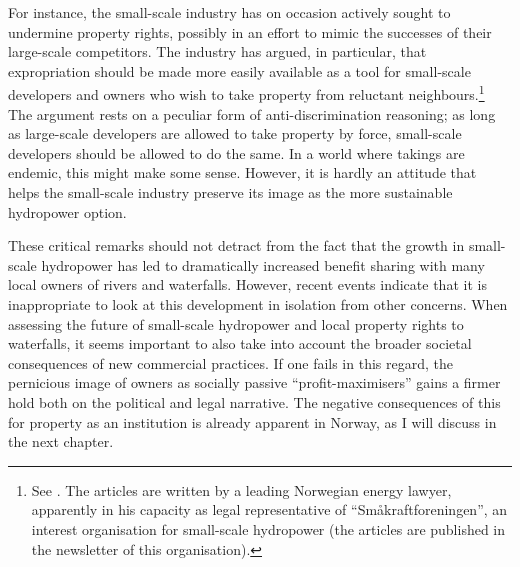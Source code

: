 For instance, the small-scale industry has on occasion actively sought to undermine property rights, possibly in an effort to mimic the successes of their large-scale competitors. The industry has argued, in particular, that expropriation should be made more easily available as a tool for small-scale developers and owners who wish to take property from reluctant neighbours.\footnote{See \cite{brekken07,brekken08}. The articles are written by a leading Norwegian energy lawyer, apparently in his capacity as legal representative of ``Småkraftforeningen'', an interest organisation for small-scale hydropower (the articles are published in the newsletter of this organisation).} The argument rests on a peculiar form of anti-discrimination reasoning; as long as large-scale developers are allowed to take property by force, small-scale developers should be allowed to do the same. In a world where takings are endemic, this might make some sense. However, it is hardly an attitude that helps the small-scale industry preserve its image as the more sustainable hydropower option.


These critical remarks should not detract from the fact that the growth in small-scale hydropower has led to dramatically increased benefit sharing with many local owners of rivers and waterfalls. However, recent events indicate that it is inappropriate to look at this development in isolation from other concerns. When assessing the future of small-scale hydropower and local property rights to waterfalls, it seems important to also take into account the broader societal consequences of new commercial practices. If one fails in this regard, the pernicious image of owners as socially passive ``profit-maximisers'' gains a firmer hold both on the political and legal narrative. The negative consequences of this for property as an institution is already apparent in Norway, as I will discuss in the next chapter.

